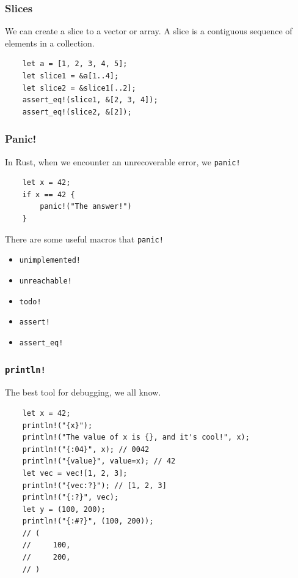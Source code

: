 \documentclass[aspectratio=1610,t]{beamer}
\begin{document}

\begin{frame}[fragile]
\frametitle{Slices}
We can create a slice to a vector or array. A slice is a contiguous sequence of elements in a collection.

\begin{verbatim}
    let a = [1, 2, 3, 4, 5];
    let slice1 = &a[1..4];
    let slice2 = &slice1[..2];
    assert_eq!(slice1, &[2, 3, 4]);
    assert_eq!(slice2, &[2]);
\end{verbatim}
\end{frame}


\begin{frame}[fragile]
\frametitle{Panic!}
In Rust, when we encounter an unrecoverable error, we \texttt{panic!}

\begin{verbatim}
    let x = 42;
    if x == 42 {
        panic!("The answer!")
    }
\end{verbatim}

There are some useful macros that \texttt{panic!}

\begin{itemize}
    \item \texttt{unimplemented!}
    \item \texttt{unreachable!}
    \item \texttt{todo!}
    \item \texttt{assert!}
    \item \texttt{assert\_eq!}
\end{itemize}
\end{frame}


\begin{frame}[fragile]
\frametitle{\texttt{println!}}
The best tool for debugging, we all know. 

\begin{verbatim}
    let x = 42;
    println!("{x}");
    println!("The value of x is {}, and it's cool!", x);
    println!("{:04}", x); // 0042
    println!("{value}", value=x); // 42
    let vec = vec![1, 2, 3];
    println!("{vec:?}"); // [1, 2, 3]
    println!("{:?}", vec);
    let y = (100, 200);
    println!("{:#?}", (100, 200));
    // (
    //     100,
    //     200,
    // )
\end{verbatim}
\end{frame}
\end{document}
